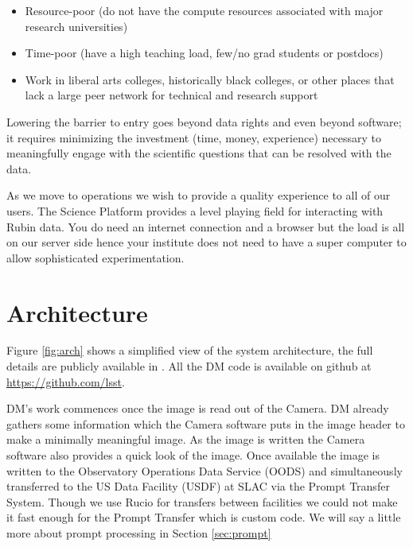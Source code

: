 \documentclass[11pt,twoside]{article}
\begin{document}
\begin{itemize}
\item Resource-poor (do not have the compute resources associated with major research universities)
\item Time-poor (have a high teaching load, few/no grad students or postdocs)
\item Work in liberal arts colleges, historically black colleges, or other places that lack a large peer network for technical and research support

\end{itemize}

Lowering the barrier to entry goes beyond data rights and even beyond software; it requires minimizing the investment (time, money, experience) necessary to meaningfully engage with the scientific questions that can be resolved with the data.


As we move to operations we wish to provide a quality experience to all of our users.
The Science Platform provides a level playing field for interacting with Rubin data.
You do need an internet connection and a browser but the load is all on our server side hence your institute does not need to have a super computer to allow sophisticated experimentation.


\section{Architecture}
 Figure \ref{fig:arch} shows a simplified view of the system architecture, the full details are publicly available in \citep{LDM-148}. All the DM code is available on github at \url{https://github.com/lsst}.


\begin{centering}
\end{centering}

DM's work commences once the image is read out of the Camera. DM already gathers some information which the Camera software puts in the image header to make a minimally meaningful image.
As the image is written the Camera software also provides a quick look  of the image.
Once available the image is written to the Observatory Operations Data Service (OODS) and simultaneously transferred to the US Data Facility (USDF) at SLAC via the Prompt Transfer System. Though we use Rucio for transfers between facilities we could not make it fast enough for the Prompt Transfer which is custom code. We will say a little more about prompt processing in Section \ref{sec:prompt}
\end{document}
